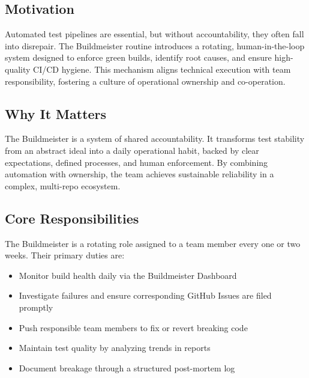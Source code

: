 \subsection{Motivation}

Automated test pipelines are essential, but without accountability, they
often fall into disrepair. The Buildmeister routine introduces a
rotating, human-in-the-loop system designed to enforce green builds,
identify root causes, and ensure high-quality CI/CD hygiene. This
mechanism aligns technical execution with team responsibility, fostering
a culture of operational ownership and co-operation.

\subsection{Why It Matters}

The Buildmeister is a system of shared accountability. It transforms test
stability from an abstract ideal into a daily operational habit, backed by
clear expectations, defined processes, and human enforcement. By combining
automation with ownership, the team achieves sustainable reliability in a
complex, multi-repo ecosystem.

\subsection{Core Responsibilities}

The Buildmeister is a rotating role assigned to a team member every one or two weeks. Their primary duties are:

\begin{itemize}
  \item Monitor build health daily via the Buildmeister Dashboard

  \item Investigate failures and ensure corresponding GitHub Issues are filed
    promptly

  \item Push responsible team members to fix or revert breaking code

  \item Maintain test quality by analyzing trends in reports

  \item Document breakage through a structured post-mortem log
\end{itemize}

